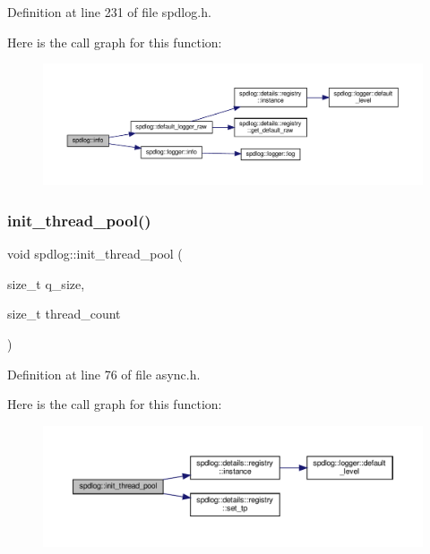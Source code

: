 Definition at line 231 of file spdlog.\+h.

Here is the call graph for this function\+:
\nopagebreak
\begin{figure}[H]
\begin{center}
\leavevmode
\includegraphics[width=350pt]{namespacespdlog_ad68b6f9b65e1e8daab0117d75f0c39b4_cgraph}
\end{center}
\end{figure}
\mbox{\label{namespacespdlog_a17a4d95759b4076827905fd8f6b10d36}} 
\subsubsection{\texorpdfstring{init\+\_\+thread\+\_\+pool()}{init\_thread\_pool()}}
{\footnotesize\ttfamily void spdlog\+::init\+\_\+thread\+\_\+pool (\begin{DoxyParamCaption}\item[{size\+\_\+t}]{q\+\_\+size,  }\item[{size\+\_\+t}]{thread\+\_\+count }\end{DoxyParamCaption})\hspace{0.3cm}{\ttfamily [inline]}}



Definition at line 76 of file async.\+h.

Here is the call graph for this function\+:
\nopagebreak
\begin{figure}[H]
\begin{center}
\leavevmode
\includegraphics[width=350pt]{namespacespdlog_a17a4d95759b4076827905fd8f6b10d36_cgraph}
\end{center}
\end{figure}
\mbox{\label{namespacespdlog_acc4ad5305b408c41a60540b0e2a8aa85}} 
